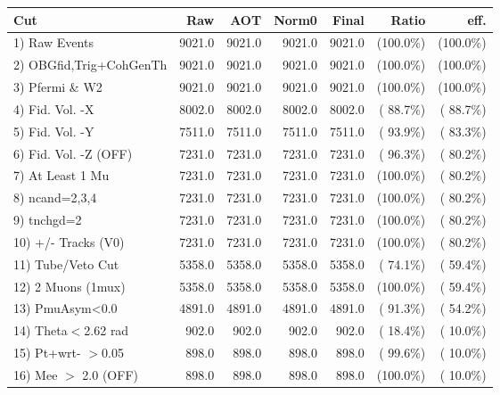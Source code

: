  \begin{table}[h!]\centering
 \begin{tabular}{||l||r|r|r|r|r|r||}
 \hline
 \hline
 Cut & Raw & AOT & Norm0 & Final & Ratio & eff.       \\
 \hline
  1) Raw Events           &       9021.0 &       9021.0 &       9021.0 &       9021.0 & (100.0\%) & (100.0\%) \\
  2) OBGfid,Trig+CohGenTh &       9021.0 &       9021.0 &       9021.0 &       9021.0 & (100.0\%) & (100.0\%) \\
  3) Pfermi \& W2         &       9021.0 &       9021.0 &       9021.0 &       9021.0 & (100.0\%) & (100.0\%) \\
  4) Fid. Vol. -X         &       8002.0 &       8002.0 &       8002.0 &       8002.0 & ( 88.7\%) & ( 88.7\%) \\
  5) Fid. Vol. -Y         &       7511.0 &       7511.0 &       7511.0 &       7511.0 & ( 93.9\%) & ( 83.3\%) \\
  6) Fid. Vol. -Z (OFF)   &       7231.0 &       7231.0 &       7231.0 &       7231.0 & ( 96.3\%) & ( 80.2\%) \\
  7) At Least 1 Mu        &       7231.0 &       7231.0 &       7231.0 &       7231.0 & (100.0\%) & ( 80.2\%) \\
  8) ncand=2,3,4          &       7231.0 &       7231.0 &       7231.0 &       7231.0 & (100.0\%) & ( 80.2\%) \\
  9) tnchgd=2             &       7231.0 &       7231.0 &       7231.0 &       7231.0 & (100.0\%) & ( 80.2\%) \\
 10) +/- Tracks (V0)      &       7231.0 &       7231.0 &       7231.0 &       7231.0 & (100.0\%) & ( 80.2\%) \\
 11) Tube/Veto Cut        &       5358.0 &       5358.0 &       5358.0 &       5358.0 & ( 74.1\%) & ( 59.4\%) \\
 12) 2 Muons (1mux)       &       5358.0 &       5358.0 &       5358.0 &       5358.0 & (100.0\%) & ( 59.4\%) \\
 13) PmuAsym<0.0          &       4891.0 &       4891.0 &       4891.0 &       4891.0 & ( 91.3\%) & ( 54.2\%) \\
 14) Theta$<$2.62 rad     &        902.0 &        902.0 &        902.0 &        902.0 & ( 18.4\%) & ( 10.0\%) \\
 15) Pt+wrt- $>$0.05      &        898.0 &        898.0 &        898.0 &        898.0 & ( 99.6\%) & ( 10.0\%) \\
 16) Mee $>$ 2.0  (OFF)   &        898.0 &        898.0 &        898.0 &        898.0 & (100.0\%) & ( 10.0\%) \\

\end{tabular}
\end{table}
